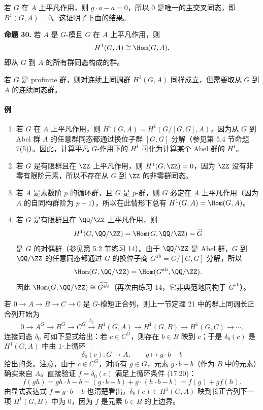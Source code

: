 若 $G$ 在 $A$ 上平凡作用，则 $g\cdot a-a=0$，所以 $0$ 是唯一的主交叉同态，即 $B^1(G,A)=0$。这证明了下面的结果。

\medskip
\noindent\textbf{命题 30.} 若 $A$ 是 $G$-模且 $G$ 在 $A$ 上平凡作用，则
\[
  H^1(G,A)\cong\Hom(G,A),
\]
即从 $G$ 到 $A$ 的所有群同态构成的群。

若 $G$ 是 profinite 群，则对连续上同调群 $H^1(G,A)$ 同样成立，但需要取从 $G$ 到 $A$ 的连续同态群。

\paragraph{例}
\begin{enumerate}[label=(\arabic*)]
  \item 若 $G$ 在 $A$ 上平凡作用，则 $H^1(G,A)=H^1(G/[G,G],A)$，因为从 $G$ 到 Abel 群 $A$ 的任意群同态都通过换位子群 $[G,G]$ 分解（参见第 5.4 节命题 7(5)）。因此，计算平凡 $G$-作用下的 $H^1$ 可化为计算某个 Abel 群的 $H^1$。
  \item 若 $G$ 是有限群且在 $\ZZ$ 上平凡作用，则 $H^1(G,\ZZ)=0$，因为 $\ZZ$ 没有非零有限阶元素，所以不存在从 $G$ 到 $\ZZ$ 的非零群同态。
  \item 若 $A$ 是素数阶 $p$ 的循环群，且 $G$ 是 $p$-群，则 $G$ 必定在 $A$ 上平凡作用（因为 $A$ 的自同构群阶为 $p-1$），所以在此情形下总有 $H^1(G,A)=\Hom(G,A)$。
  \item 若 $G$ 是有限群且在 $\QQ/\ZZ$ 上平凡作用，则
  \[
    H^1(G,\QQ/\ZZ)=\Hom(G,\QQ/\ZZ)=\widehat G
  \]
  是 $G$ 的对偶群（参见第 5.2 节练习 14）。由于 $\QQ/\ZZ$ 是 Abel 群，$G$ 到 $\QQ/\ZZ$ 的任意同态都通过 $G$ 的换位子商 $G^{\mathrm{ab}}=G/[G,G]$ 分解，所以
  \[
    \Hom(G,\QQ/\ZZ)=\Hom(G^{\mathrm{ab}},\QQ/\ZZ).
  \]
  因此 $\Hom(G,\QQ/\ZZ)\cong\widehat{G^{\mathrm{ab}}}$（再次由练习 14，它非典范地同构于 $G^{\mathrm{ab}}$）。
\end{enumerate}

若 $0\to A\to B\to C\to0$ 是 $G$-模短正合列，则上一节定理 21 中的群上同调长正合列开始为
\[
  0\to A^G\to B^G\to C^G\xrightarrow{\delta_0}H^1(G,A)\to H^1(G,B)\to H^1(G,C)\to\cdots .
\]
连接同态 $\delta_0$ 可如下显式给出：若 $c\in C^G$，则存在 $b\in B$ 映到 $c$；于是 $\delta_0(c)$ 是 $H^1(G,A)$ 中由 $1$-上循环
\[
  \delta_0(c):G\to A,
  \qquad g\mapsto g\cdot b-b
\]
给出的类。注意，由于 $c\in C^G$，对所有 $g\in G$，元素 $g\cdot b-b$（作为 $B$ 中的元素）确实来自 $A$。直接验证 $f=\delta_0(c)$ 满足上循环条件 (17.20)：
\[
  f(gh)=gh\cdot b-b=(g\cdot b-b)+g\cdot(h\cdot b-b)=f(g)+gf(h).
\]
由显式表达式 $f=g\cdot b-b$ 也清楚看出，$\delta_0(c)\in H^1(G,A)$ 映到长正合列下一项 $H^1(G,B)$ 中为 $0$，因为 $f$ 是元素 $b\in B$ 的上边界。


